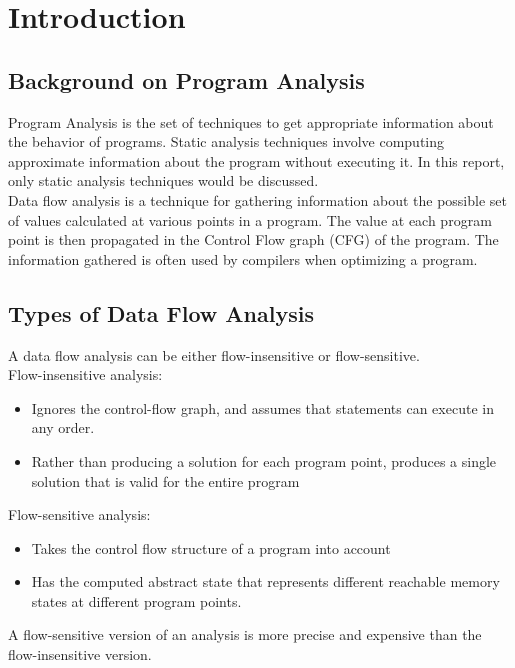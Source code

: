\chapter{Introduction}

\section{Background on Program Analysis}

Program Analysis is the set of techniques to get appropriate information about the behavior of programs. Static analysis techniques involve computing approximate information about the program without executing it. In this report, only static analysis techniques would be discussed.  \\ 


Data flow analysis is a technique for gathering information about the possible set of values calculated at various points in a program. The value at each program point is then propagated in the Control Flow graph (CFG) of the program.  The information gathered is often used by compilers when optimizing a program. 

\section{Types of Data Flow Analysis}

A data flow analysis can be either flow-insensitive or flow-sensitive. \\ 

Flow-insensitive analysis:
\begin{itemize}
	\item Ignores the control-flow graph, and assumes that statements can execute in any order.
	\item Rather than producing a solution for each program point, produces a single solution that is valid for the entire program
\end{itemize}
 
Flow-sensitive analysis:
\begin{itemize}
	\item Takes the control
	flow structure of a program into account
	\item Has the computed abstract state that represents different reachable memory states at different program points.
\end{itemize}

A flow-sensitive version of
an analysis is more precise and expensive than the flow-insensitive version. \\

